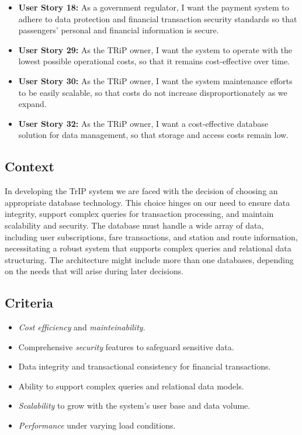 \begin{itemize}
    \item \textbf{User Story 18:} As a government regulator, I want the payment system to adhere to data protection and financial transaction security standards so that passengers' personal and financial information is secure.
    \item \textbf{User Story 29:} As the TRiP owner, I want the system to operate with the lowest possible operational costs, so that it remains cost-effective over time.  
    \item \textbf{User Story 30:} As the TRiP owner, I want the system maintenance efforts to be easily scalable, so that costs do not increase disproportionately as we expand. 
    \item \textbf{User Story 32:} As the TRiP owner, I want a cost-effective database solution for data management, so that storage and access costs remain low. 
\end{itemize}

\subsection*{Context}
In developing the TrIP system we are faced with the decision of choosing an appropriate database technology. This choice hinges on our need to ensure data integrity, support complex queries for transaction processing, and maintain scalability and security.
The database must handle a wide array of data, including user subscriptions, fare transactions, and station and route information, necessitating a robust system that supports complex queries and relational data structuring.
The architecture might include more than one databases, depending on the needs that will arise during later decisions.

\subsection*{Criteria}
\begin{itemize}
    \item \textit{Cost efficiency} and \textit{mainteinability}.
    \item Comprehensive \textit{security} features to safeguard sensitive data.
    \item Data integrity and transactional consistency for financial transactions.
    \item Ability to support complex queries and relational data models.
    \item \textit{Scalability} to grow with the system's user base and data volume.
    \item \textit{Performance} under varying load conditions.
\end{itemize}

